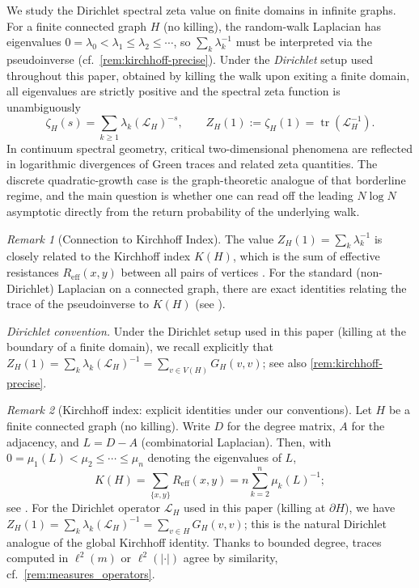 \documentclass[reqno]{amsart}
\numberwithin{equation}{section}
\theoremstyle{definition}
\theoremstyle{remark}
\newtheorem{remark}[remark]{Remark}
\newcommand{\Cref}[1]{\autoref{#1}}
\DeclareMathOperator{\tr}{tr}
\newcommand{\LL}{\mathcal{L}}
\newcommand{\Reff}{R_{\mathrm{eff}}}
\begin{document}
We study the Dirichlet spectral zeta value on finite domains in infinite graphs. For a finite connected graph $H$ (no killing), the random-walk Laplacian has eigenvalues $0=\lambda_0 < \lambda_1 \leq \lambda_2 \leq \cdots$, so $\sum_k \lambda_k^{-1}$ must be interpreted via the pseudoinverse (cf.\ \Cref{rem:kirchhoff-precise}). Under the \emph{Dirichlet} setup used throughout this paper, obtained by killing the walk upon exiting a finite domain, all eigenvalues are strictly positive and the spectral zeta function is unambiguously
\[
  \zeta_H(s)=\sum_{k\ge1}\lambda_k(\LL_H)^{-s},\qquad Z_H(1):=\zeta_H(1)=\tr(\LL_H^{-1}).
\]
In continuum spectral geometry, critical two-dimensional phenomena are reflected in logarithmic divergences of Green traces and related zeta quantities. The discrete quadratic-growth case is the graph-theoretic analogue of that borderline regime, and the main question is whether one can read off the leading $N\log N$ asymptotic directly from the return probability of the underlying walk.

\begin{remark}[Connection to Kirchhoff Index]\label{rem:kirchhoff}
The value $Z_H(1) = \sum_k \lambda_k^{-1}$ is closely related to the Kirchhoff index $K(H)$, which is the sum of effective resistances $\Reff(x,y)$ between all pairs of vertices \cite{KleinRandic93}. For the standard (non-Dirichlet) Laplacian on a connected graph, there are exact identities relating the trace of the pseudoinverse to $K(H)$ (see \cite[Chapter 9]{LyonsPeres16}).
\end{remark}

\noindent\textit{Dirichlet convention.} Under the Dirichlet setup used in this paper (killing at the boundary of a finite domain),
we recall explicitly that
$Z_H(1)=\sum_k \lambda_k(\LL_H)^{-1}=\sum_{v\in V(H)} G_H(v,v)$; see also \Cref{rem:kirchhoff-precise}.

\begin{remark}[Kirchhoff index: explicit identities under our conventions]\label{rem:kirchhoff-precise}
Let $H$ be a finite connected graph (no killing). Write $D$ for the degree matrix, $A$ for the adjacency, and $L=D-A$ (combinatorial Laplacian). Then, with $0=\mu_1(L)<\mu_2\le\cdots\le\mu_n$ denoting the eigenvalues of $L$,
\[
  K(H)=\sum_{\{x,y\}}\Reff(x,y)=n\sum_{k=2}^n \mu_k(L)^{-1};
\]
see \cite[Thm.~9.23]{LyonsPeres16}. For the Dirichlet operator $\LL_H$ used in this paper (killing at $\partial H$), we have $Z_H(1)=\sum_k\lambda_k(\LL_H)^{-1}=\sum_{v\in H}G_H(v,v)$; this is the natural Dirichlet analogue of the global Kirchhoff identity. Thanks to bounded degree, traces computed in $\ell^2(m)$ or $\ell^2(|\cdot|)$ agree by similarity, cf.\ \Cref{rem:measures_operators}.
\end{remark}
\end{document}
